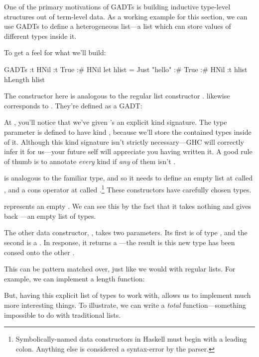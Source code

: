 \documentclass[book.tex]{subfiles}
\begin{document}

One of the primary motivations of GADTs is building inductive type-level
structures out of term-level data. As a working example for this section, we can use GADTs
to define a heterogeneous list---a list which can store values of different
types inside it.

To get a feel for what we'll build:

\begin{dorepl}{GADTs}
:t HNil
:t True :# HNil
let hlist = Just "hello" :# True :# HNil
:t hlist
hLength hlist
\end{dorepl}

The  constructor here is analogous to the regular list constructor
\hs{[]}. \hs{(:\#)} likewise corresponds to \hs{(:)}. They're defined as a GADT:


At , you'll notice that we've given 's  an explicit kind
signature.  The type parameter  is defined to have kind \kind{[Type]},
because we'll store the contained types inside of it. Although this kind
signature isn't strictly necessary---GHC will correctly infer it for us---your
future self will appreciate you having written it. A good rule of thumb is to
annotate \emph{every} kind if \emph{any} of them isn't .

 is analogous to the familiar \ty{[]} type, and so it needs to define
an empty list at  called , and a cons operator at 
called \hs{(:\#)}.\footnote{Symbolically-named data constructors in Haskell must
begin with a leading colon. Anything else is considered a syntax-error by the
parser.} These constructors have carefully chosen types.

 represents an empty . We can see this by the fact that it
takes nothing and gives back ---an empty list of types.

The other data constructor, \hs{(:\#)}, takes two parameters. Its first is of
type , and the second is a . In response, it returns a
---the result is this new type has been consed onto the
other .

This  can be pattern matched over, just like we would with regular
lists. For example, we can implement a length function:


But, having this explicit list of types to work with, allows us to implement
much more interesting things. To illustrate, we can write a \emph{total}
 function---something impossible to do with traditional lists.
\end{document}
